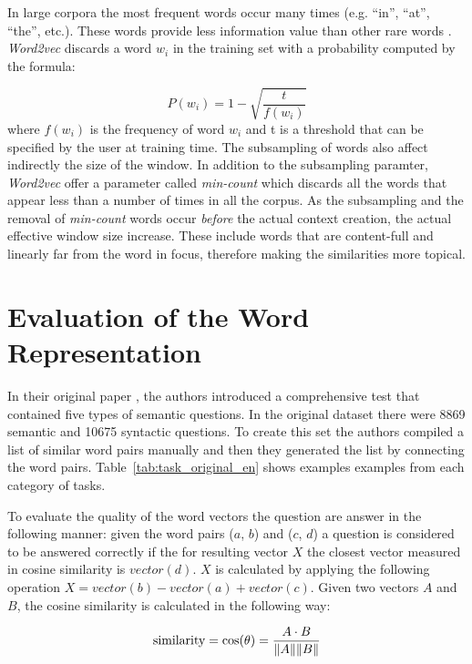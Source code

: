 In large corpora the most frequent words occur many times (e.g.
``in'', ``at'', ``the'', etc.). These words  provide  less information value
than other rare words  \cite{MikolovSCCD13}.  \textit{Word2vec} discards a
word $w_i$ in the training set with a probability computed by the formula:

\begin{equation}
  \label{eq:w2v-subsampling}
  P(w_i)= 1 - \sqrt{\frac{t}{f(w_i)}}
\end{equation}
where $f(w_i)$  is the frequency of word $w_i$ and t is a threshold that can
be specified  by the user at training time. The subsampling of words also
affect indirectly the size of the window. In addition to the subsampling
paramter, \textit{Word2vec} offer a parameter called 
\textit{min-count} which discards all the words that appear less than a
number of times in all the corpus.   As the subsampling and the removal of
\textit{min-count} words occur  \emph{before} the actual context creation,
the actual effective window size increase. These include words that are
content-full and linearly far from the word in focus, therefore making the similarities more topical.


\section{Evaluation of the Word Representation}
\label{sec:w2v-evaluation-word-repr}

In their original paper \cite{DBLP:journals/corr/abs-1301-3781}, the authors
introduced a comprehensive test that contained five types of semantic
questions. In the original dataset  there were 8869 semantic and 10675
syntactic questions. To create this set the authors compiled a list of
similar word pairs manually and then they generated the list by
connecting the word pairs. Table~\ref{tab:task_original_en} shows examples 
examples from each category of tasks. 

To evaluate the quality of the word vectors the question  are answer in the
following manner: given the word pairs ($a$, $b$) and ($c$, $d$) a question
is considered to be answered correctly if the for resulting vector $X$ the closest vector measured in
cosine similarity is  $vector(d)$. $X$ is calculated by applying the following
operation $X = vector(b) - vector(a) + vector(c)$.  Given two vectors $A$ and $B$, the
cosine similarity is calculated in the following way: 

$$\text{similarity} = \cos(\theta) = {A \cdot B \over \|A\| \|B\|}$$


